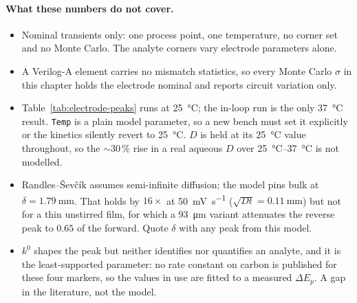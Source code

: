 \paragraph{What these numbers do not cover.}
\begin{itemize}[nosep]
  \item Nominal transients only: one process point, one temperature, no corner
    set and no Monte Carlo. The analyte corners vary electrode parameters alone.
  \item A Verilog-A element carries no mismatch statistics, so every Monte Carlo
    \(\sigma\) in this chapter holds the electrode nominal and reports circuit
    variation only.
  \item Table~\ref{tab:electrode-peaks} runs at \SI{25}{\celsius}; the in-loop
    run is the only \SI{37}{\celsius} result. \texttt{Temp} is a plain model
    parameter, so a new bench must set it explicitly or the kinetics silently
    revert to \SI{25}{\celsius}. \(D\) is held at its \SI{25}{\celsius} value throughout, so the
    \(\sim\)30\,\% rise in a real aqueous \(D\) over \SIrange{25}{37}{\celsius}
    is not modelled.
  \item Randles--\v{S}ev\v{c}\'ik assumes semi-infinite diffusion; the model
    pins bulk at \(\delta = \SI{1.79}{\milli\metre}\). That holds by
    \(16\times\) at \SI{50}{\milli\volt\per\second} (\(\sqrt{Dt} =
    \SI{0.11}{\milli\metre}\)) but not for a thin unstirred
    film, for which a \SI{93}{\micro\metre} variant attenuates the reverse peak
    to \(0.65\) of the forward. Quote \(\delta\) with any peak from this model.
  \item \(k^0\) shapes the peak but neither identifies nor quantifies an
    analyte, and it is the least-supported parameter: no rate constant on carbon
    is published for these four markers, so the values in use are fitted to a
    measured \(\Delta E_p\). A gap in the literature, not the model.
\end{itemize}
